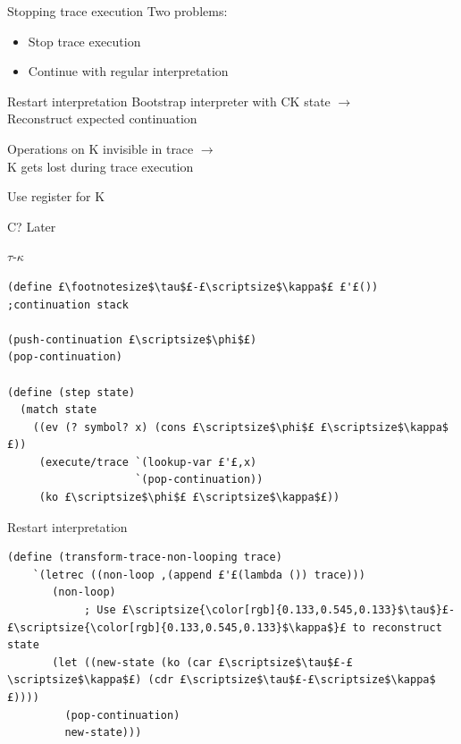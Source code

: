 \documentclass{beamer}
\begin{document}
\begin{frame}[fragile]{Stopping trace execution}
Two problems:

\begin{itemize}
\item Stop trace execution
\item Continue with regular interpretation
\end{itemize}

\end{frame}

\begin{frame}[fragile]{Restart interpretation}
Bootstrap interpreter with CK state $\rightarrow$ \\
Reconstruct expected continuation

\pause

\vspace{1cm}

Operations on K invisible in trace $\rightarrow$ \\ K gets lost during trace execution

\pause

Use register for K

\pause

\vspace{0.5cm}

C? Later

\end{frame}

\begin{frame}[fragile]{$\tau$-$\kappa$}

\begin{lstlisting}[basicstyle = \scriptsize\ttfamily, escapechar = £]
(define £\footnotesize$\tau$£-£\scriptsize$\kappa$£ £'£()) ;continuation stack

(push-continuation £\scriptsize$\phi$£)
(pop-continuation)

(define (step state)
  (match state
    ((ev (? symbol? x) (cons £\scriptsize$\phi$£ £\scriptsize$\kappa$£))
     (execute/trace `(lookup-var £'£,x)
                    `(pop-continuation))
     (ko £\scriptsize$\phi$£ £\scriptsize$\kappa$£))
\end{lstlisting}

\end{frame}

\begin{frame}[fragile]{Restart interpretation}
\begin{lstlisting}[basicstyle = \scriptsize\ttfamily, escapechar = £]
(define (transform-trace-non-looping trace)
    `(letrec ((non-loop ,(append £'£(lambda ()) trace)))
       (non-loop)
            ; Use £\scriptsize{\color[rgb]{0.133,0.545,0.133}$\tau$}£-£\scriptsize{\color[rgb]{0.133,0.545,0.133}$\kappa$}£ to reconstruct state
       (let ((new-state (ko (car £\scriptsize$\tau$£-£\scriptsize$\kappa$£) (cdr £\scriptsize$\tau$£-£\scriptsize$\kappa$£))))
         (pop-continuation)
         new-state)))
\end{lstlisting}
\end{frame}
\end{document}
